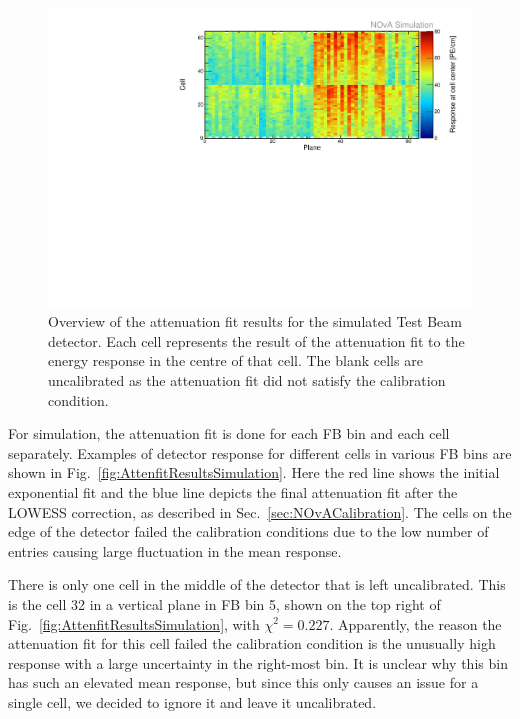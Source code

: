 \begin{figure}[h]
\centering
\includegraphics[width=\textwidth]{Plots/TBCalibration/CellResponseAtCentre_Prod4DataBasedSim_Limited_NOvAPlotStyle.pdf}
\caption[Map of fitted response at cell centre for simulation]{Overview of the attenuation fit results for the simulated Test Beam detector. Each cell represents the result of the attenuation fit to the energy response in the centre of that cell. The blank cells are uncalibrated as the attenuation fit did not satisfy the calibration condition.}
\label{fig:CellCentreResponseSim}
\end{figure}

For simulation, the attenuation fit is done for each \gls{FB} bin and each cell separately. Examples of detector response for different cells in various \gls{FB} bins are shown in Fig.~\ref{fig:AttenfitResultsSimulation}. Here the red line shows the initial exponential fit and the blue line depicts the final attenuation fit after the \gls{LOWESS} correction, as described in Sec.~\ref{sec:NOvACalibration}. The cells on the edge of the detector failed the calibration conditions due to the low number of entries causing large fluctuation in the mean response.

There is only one cell in the middle of the detector that is left uncalibrated. This is the cell 32 in a vertical plane in \gls{FB} bin 5, shown on the top right of Fig.~\ref{fig:AttenfitResultsSimulation}, with $\chi^2=0.227$. Apparently, the reason the attenuation fit for this cell failed the calibration condition is the unusually high response with a large uncertainty in the right-most bin. It is unclear why this bin has such an elevated mean response, but since this only causes an issue for a single cell, we decided to ignore it and leave it uncalibrated.

